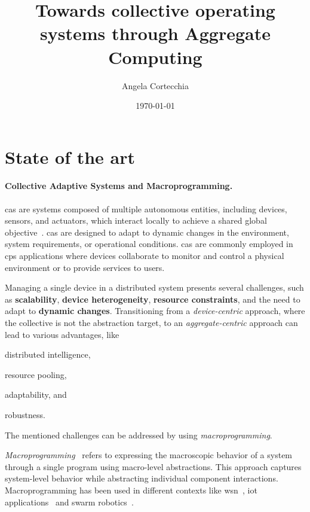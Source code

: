 \documentclass[12pt, a4paper]{article}
\newenvironment{inlinelist}{\begin{enumerate*}[label=\emph{(\roman*)}]}{\end{enumerate*}}
\begin{document}
\title{Towards collective operating systems through Aggregate Computing}

\author{Angela Cortecchia}
\date{\today}
\maketitle


\section{State of the art}
\label{sec:state-of-the-art}

\sloppypar
\paragraph{Collective Adaptive Systems and Macroprogramming.}
\ac{cas} are systems composed of multiple autonomous entities,
including devices, sensors, and actuators, which interact locally to achieve a shared global objective~\cite{ferscha2015}.
%
\ac{cas} are designed to adapt to dynamic changes in the environment, system requirements, or operational conditions.
%
\ac{cas} are commonly employed in \ac{cps} applications where devices collaborate to monitor and control a
physical environment or to provide services to users.

Managing a single device in a distributed system presents several challenges,
such as \textbf{scalability}, \textbf{device heterogeneity},
\textbf{resource constraints}, and the need to adapt to \textbf{dynamic changes}.
%
Transitioning from a \emph{device-centric} approach,
where the collective is not the abstraction target,
to an \emph{aggregate-centric} approach can lead to various advantages, like
\begin{inlinelist}
    \item distributed intelligence,
    \item resource pooling,
    \item adaptability, and
    \item robustness.
\end{inlinelist}
%
The mentioned challenges can be addressed by using \emph{macroprogramming}.

\emph{Macroprogramming}~\cite{casadei2023} refers
to expressing the macroscopic behavior of a system through a single program using
macro-level abstractions.
%
This approach captures system-level behavior while abstracting individual component interactions.
%
Macroprogramming has been used in different contexts like \ac{wsn}~\cite{1440891}, \ac{iot} applications~\cite{noor19,mizzi18} and swarm robotics~\cite{buzz}.
\end{document}
